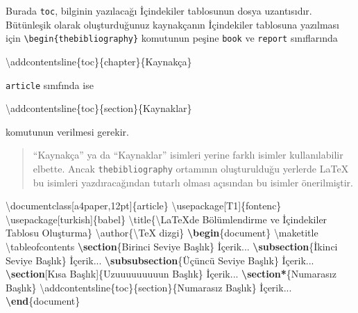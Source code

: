 \documentclass[
  10pt,
]{scrbook}
\newenvironment{Shaded}{\begin{snugshade}}{\end{snugshade}}
\newcommand{\BuiltInTok}[1]{#1}
\newcommand{\ExtensionTok}[1]{#1}
\newcommand{\FunctionTok}[1]{\textcolor[rgb]{0.00,0.00,0.00}{#1}}
\newcommand{\KeywordTok}[1]{\textcolor[rgb]{0.13,0.29,0.53}{\textbf{#1}}}
\newcommand{\NormalTok}[1]{#1}
\theoremstyle{definition}
\theoremstyle{definition}
\theoremstyle{definition}
\theoremstyle{definition}
\theoremstyle{remark}
\begin{document}
Burada \texttt{toc}, bilginin yazılacağı İçindekiler tablosunun dosya uzantısıdır. Bütünleşik olarak oluşturduğunuz kaynakçanın İçindekiler tablosuna yazılması için \texttt{\textbackslash{}begin\{thebibliography\}} komutunun peşine \texttt{book} ve \texttt{report} sınıflarında

\begin{Shaded}
\begin{Highlighting}[]
\FunctionTok{\textbackslash{}addcontentsline}\NormalTok{\{toc\}\{chapter\}\{Kaynakça\}}
\end{Highlighting}
\end{Shaded}

\texttt{article} sınıfında ise

\begin{Shaded}
\begin{Highlighting}[]
\FunctionTok{\textbackslash{}addcontentsline}\NormalTok{\{toc\}\{section\}\{Kaynaklar\}}
\end{Highlighting}
\end{Shaded}

komutunun verilmesi gerekir.

\begin{quote}
``Kaynakça'' ya da ``Kaynaklar'' isimleri yerine farklı isimler kullanılabilir elbette. Ancak \texttt{thebibliography} ortamının oluşturulduğu yerlerde LaTeX bu isimleri yazdıracağından tutarlı olması açısından bu isimler önerilmiştir.
\end{quote}

\begin{Shaded}
\begin{Highlighting}[]
\BuiltInTok{\textbackslash{}documentclass}\NormalTok{[a4paper,12pt]\{}\ExtensionTok{article}\NormalTok{\}}
\BuiltInTok{\textbackslash{}usepackage}\NormalTok{[T1]\{}\ExtensionTok{fontenc}\NormalTok{\}}
\BuiltInTok{\textbackslash{}usepackage}\NormalTok{[turkish]\{}\ExtensionTok{babel}\NormalTok{\}}
\FunctionTok{\textbackslash{}title}\NormalTok{\{}\FunctionTok{\textbackslash{}LaTeX}\NormalTok{\textquotesingle{}de Bölümlendirme  ve İçindekiler Tablosu Oluşturma\}}
\FunctionTok{\textbackslash{}author}\NormalTok{\{}\FunctionTok{\textbackslash{}TeX}\NormalTok{ dizgi\}}
\KeywordTok{\textbackslash{}begin}\NormalTok{\{}\ExtensionTok{document}\NormalTok{\}}
\FunctionTok{\textbackslash{}maketitle}
\FunctionTok{\textbackslash{}tableofcontents}
\KeywordTok{\textbackslash{}section}\NormalTok{\{Birinci Seviye Başlık\}}
\NormalTok{  İçerik...}
\KeywordTok{\textbackslash{}subsection}\NormalTok{\{İkinci Seviye Başlık\}}
\NormalTok{  İçerik...}
\KeywordTok{\textbackslash{}subsubsection}\NormalTok{\{Üçüncü Seviye Başlık\}}
\NormalTok{  İçerik...}
\KeywordTok{\textbackslash{}section}\NormalTok{[Kısa Başlık]\{Uzuuuuuuuuun Başlık\}}
\NormalTok{  İçerik...}
\KeywordTok{\textbackslash{}section*}\NormalTok{\{Numarasız Başlık\}}
\FunctionTok{\textbackslash{}addcontentsline}\NormalTok{\{toc\}\{section\}\{Numarasız Başlık\}}
\NormalTok{  İçerik...}
\KeywordTok{\textbackslash{}end}\NormalTok{\{}\ExtensionTok{document}\NormalTok{\}}
\end{Highlighting}
\end{Shaded}
\end{document}
